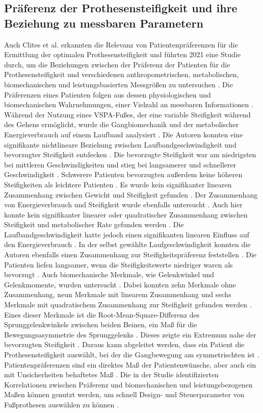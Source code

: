 \subsection{Präferenz der Prothesensteifigkeit und ihre Beziehung zu messbaren Parametern}
Auch Clites et al. erkannten die Relevanz von Patientenpräferenzen für die Ermittlung der optimalen Prothesensteifigkeit und führten 2021 eine Studie durch, um die Beziehungen zwischen der Präferenz der Patienten für die Prothesensteifigkeit und verschiedenen anthropometrischen, metabolischen, biomechanischen und leistungsbasierten Messgrößen zu untersuchen \cite{Clites.2021}. Die Präferenzen eines Patienten folgen aus dessen physiologischen und biomechanischen Wahrnehmungen, einer Vielzahl an messbaren Informationen \cite{Clites.2021}.
Während der Nutzung eines VSPA-Fußes, der eine variable Steifigkeit während des Gehens ermöglicht, wurde die Gangbiomechanik und der metabolischer Energieverbrauch auf einem Laufband analysiert \cite{Clites.2021}.
Die Autoren konnten eine signifikante nichtlineare Beziehung zwischen Laufbandgeschwindigkeit und bevorzugter Steifigkeit entdecken \cite{Clites.2021}. Die bevorzugte Steifigkeit war am niedrigsten bei mittleren Geschwindigkeiten und stieg bei langsamerer und schnellerer Geschwindigkeit \cite{Clites.2021}. 
Schwerere Patienten bevorzugten außerdem keine höheren Steifigkeiten als leichtere Patienten \cite{Clites.2021}.
Es wurde kein signifikanter linearen Zusammenhang zwischen Gewicht und Steifigkeit gefunden \cite{Clites.2021}. 
Der Zusammenhang von Energieverbrauch und Steifigkeit wurde ebenfalls untersucht \cite{Clites.2021}. Auch hier konnte kein signifikanter linearer oder quadratischer Zusammenhang zwischen Steifigkeit und metabolischer Rate gefunden werden \cite{Clites.2021}. Die Laufbandgeschwindigkeit hatte jedoch einen signifikanten linearen Einfluss auf den Energieverbrauch \cite{Clites.2021}.
In der selbst gewählte Laufgeschwindigkeit konnten die Autoren ebenfalls einen Zusammenhang zur Steifigkeitspräferenz feststellen \cite{Clites.2021}. Die Patienten liefen langsamer, wenn die Steifigkeitswerte niedriger waren als bevorzugt \cite{Clites.2021}.
Auch biomechanische Merkmale, wie Gelenkwinkel und Gelenkmomente, wurden untersucht \cite{Clites.2021}. Dabei konnten zehn Merkmale ohne Zusammenhang, neun Merkmale mit linearem Zusammenhang und sechs Merkmale mit quadratischem Zusammenhang zur Steifigkeit gefunden werden \cite{Clites.2021}. Eines dieser Merkmale ist die Root-Mean-Square-Differenz des Sprunggelenkwinkels zwischen beiden Beinen, ein Maß für die Bewegungsasymmetrie des Sprunggelenks \cite{Clites.2021}. Dieses zeigte ein Extremum nahe der bevorzugten Steifigkeit \cite{Clites.2021}.
Daraus kann abgeleitet werden, dass ein Patient die Prothesensteifigkeit auswählt, bei der die Gangbewegung am symmetrischten ist \cite{Clites.2021}.
Patientenpräferenzen sind ein direktes Maß der Patientenwünsche, aber auch ein mit Unsicherheiten behaftetes Maß \cite{Clites.2021}. Die in der Studie identifizierten Korrelationen zwischen Präferenz und biomechanischen und leistungsbezogenen Maßen können genutzt werden, um schnell Design- und Steuerparameter von Fußprothesen auswählen zu können \cite{Clites.2021}.

